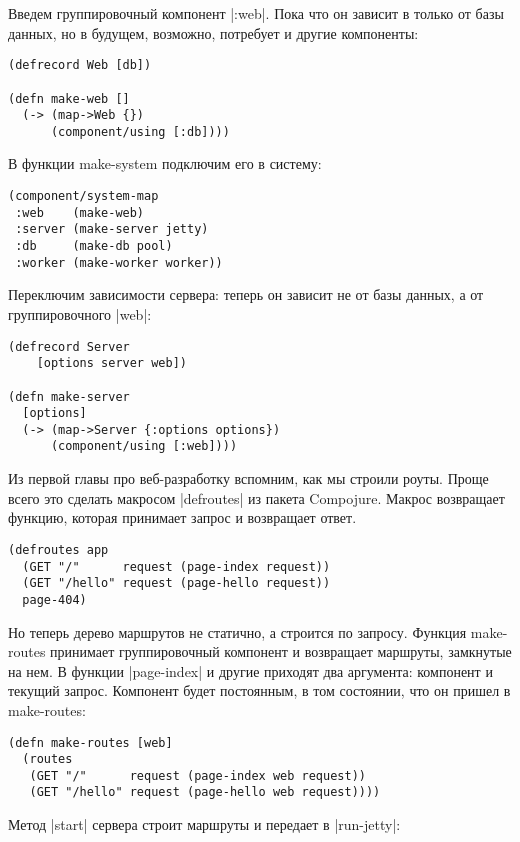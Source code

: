 Введем группировочный компонент \spverb|:web|. Пока что он зависит в только от базы
данных, но в будущем, возможно, потребует и другие компоненты:

\begin{verbatim}
(defrecord Web [db])

(defn make-web []
  (-> (map->Web {})
      (component/using [:db])))
\end{verbatim}

В функции make-system подключим его в систему:

\begin{verbatim}
(component/system-map
 :web    (make-web)
 :server (make-server jetty)
 :db     (make-db pool)
 :worker (make-worker worker))
\end{verbatim}

Переключим зависимости сервера: теперь он зависит не от базы данных, а от
группировочного \spverb|web|:

\begin{verbatim}
(defrecord Server
    [options server web])

(defn make-server
  [options]
  (-> (map->Server {:options options})
      (component/using [:web])))
\end{verbatim}

Из первой главы про веб-разработку вспомним, как мы строили роуты. Проще всего
это сделать макросом \spverb|defroutes| из пакета Compojure. Макрос возвращает функцию,
которая принимает запрос и возвращает ответ.

\begin{verbatim}
(defroutes app
  (GET "/"      request (page-index request))
  (GET "/hello" request (page-hello request))
  page-404)
\end{verbatim}

Но теперь дерево маршрутов не статично, а строится по запросу. Функция
make-routes принимает группировочный компонент и возвращает маршруты, замкнутые
на нем. В функции \spverb|page-index| и другие приходят два аргумента: компонент и
текущий запрос. Компонент будет постоянным, в том состоянии, что он пришел в
make-routes:

\begin{verbatim}
(defn make-routes [web]
  (routes
   (GET "/"      request (page-index web request))
   (GET "/hello" request (page-hello web request))))
\end{verbatim}

Метод \spverb|start| сервера строит маршруты и передает в \spverb|run-jetty|:

